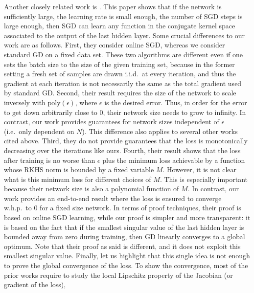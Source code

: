 \documentclass{article}
\begin{document}
Another closely related work is \cite{Amit2017}.
This paper shows that if the network is sufficiently large, 
the learning rate is small enough, the number of SGD steps is large enough,
then SGD can learn any function in the conjugate kernel space associated to the output of the last hidden layer.
Some crucial differences to our work are as follows.
First, they consider online SGD, whereas we consider standard GD on a fixed data set.
These two algorithms are different even if one sets the batch size to the size of the given training set, 
because in the former setting a fresh set of samples are drawn i.i.d.\ at every iteration, and thus the gradient 
at each iteration is not necessarily the same as the total gradient used by standard GD.
Second, their result requires the size of the network to scale inversely with $\textrm{poly}(\epsilon)$, 
where $\epsilon$ is the desired error. Thus, in order for the error to get down arbitrarily close to $0$, 
their network size needs to grow to infinity.
In contrast, our work provides guarantees for network sizes independent of $\epsilon$ (i.e.\ only dependent on $N$).
This difference also applies to several other works cited above.
Third, they do not provide guarantees that the loss is monotonically decreasing over the iterations like ours.
Fourth, their result shows that the loss after training is no worse than $\epsilon$ plus 
the minimum loss achievable by a function whose RKHS norm is bounded by a fixed variable $M$.
However, it is not clear what is this minimum loss for different choices of $M$.
This is especially important because their network size is also a polynomial function of $M$.
In contrast, our work provides an end-to-end result where the loss is ensured to converge w.h.p.\ to 0 for a fixed size network.
In terms of proof techniques, their proof is based on online SGD learning, 
while our proof is simpler and more transparent:
it is based on the fact that if the smallest singular value of the last hidden layer 
is bounded away from zero during training, then GD linearly converges to a global optimum.
Note that their proof as said is different, and it does not exploit this smallest singular value.
Finally, let us highlight that this single idea is not enough to prove the global convergence of the loss.
To show the convergence, most of the prior works require to study the local Lipschitz property of the Jacobian (or gradient of the loss),
\end{document}
